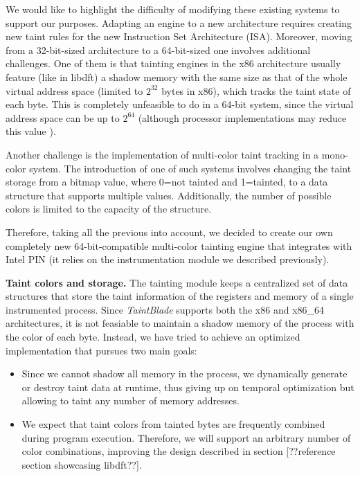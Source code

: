 \documentclass[conference]{IEEEtran}
\begin{document}
We would like to highlight the difficulty of modifying these existing systems
to support our purposes. Adapting an engine to a new architecture requires
creating new taint rules for the new Instruction Set Architecture (ISA).
Moreover, moving from a 32-bit-sized architecture to a 64-bit-sized one
involves additional challenges. One of them is that tainting engines in the x86
architecture usually feature (like in libdft) a shadow memory with the same
size as that of the whole virtual address space (limited to $2^{32}$ bytes in
x86), which tracks the taint state of each byte. This is completely unfeasible
to do in a 64-bit system, since the virtual address space can be up to $2^{64}$
(although processor implementations may reduce this value
\cite{book_practical_binary_analysis_p13}).

Another challenge is the implementation of multi-color taint tracking in a
mono-color system. The introduction of one of such systems involves changing
the taint storage from a bitmap value, where 0=not tainted and 1=tainted, to a
data structure that supports multiple values. Additionally, the number of
possible colors is limited to the capacity of the structure.

Therefore, taking all the previous into account, we decided to create our own
completely new 64-bit-compatible multi-color tainting engine that integrates
with Intel PIN (it relies on the instrumentation module we described
previously).

\textbf{Taint colors and storage.} The tainting module keeps a centralized set
of data structures that store the taint information of the registers and memory of 
a single instrumented process.
Since \textit{TaintBlade} supports both the x86 and x86\_64 architectures, it is not feasiable to
maintain a shadow memory of the process with the color of each byte. Instead, we have
tried to achieve an optimized implementation that pursues two main goals:
\begin{itemize}
    \item Since we cannot shadow all memory in the process, we dynamically generate or destroy
    taint data at runtime, thus giving up on temporal optimization but allowing to taint
    any number of memory addresses.
    \item We expect that taint colors from tainted bytes are frequently combined during 
    program execution. Therefore, we will support an arbitrary number of color combinations,
    improving the design described in section [??reference section showcasing libdft??].
\end{itemize}
\end{document}
